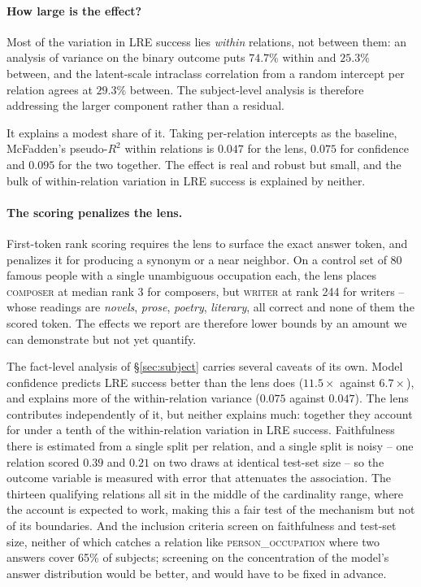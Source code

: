 \paragraph{How large is the effect?} Most of the variation in LRE success
lies \emph{within} relations, not between them: an analysis of variance on
the binary outcome puts $74.7\%$ within and $25.3\%$ between, and the
latent-scale intraclass correlation from a random intercept per relation
agrees at $29.3\%$ between. The subject-level analysis is therefore
addressing the larger component rather than a residual.

It explains a modest share of it. Taking per-relation intercepts as the
baseline, McFadden's pseudo-$R^2$ within relations is $0.047$ for the lens,
$0.075$ for confidence and $0.095$ for the two together. The effect is
real and robust but small, and the bulk of within-relation variation in
LRE success is explained by neither.

\paragraph{The scoring penalizes the lens.} First-token rank scoring
requires the lens to surface the exact answer token, and penalizes it for
producing a synonym or a near neighbor. On a control set of 80 famous
people with a single unambiguous occupation each, the lens places
\textsc{composer} at median rank 3 for composers, but \textsc{writer} at
rank 244 for writers -- whose readings are \emph{novels}, \emph{prose},
\emph{poetry}, \emph{literary}, all correct and none of them the scored
token. The effects we report are therefore lower bounds by an amount we
can demonstrate but not yet quantify.


The fact-level analysis of \S\ref{sec:subject} carries several
caveats of its own. Model confidence predicts LRE success better than
the lens does ($11.5\times$ against $6.7\times$), and explains more of the
within-relation variance ($0.075$ against $0.047$). The lens contributes
independently of it, but neither explains much: together they account for
under a tenth of the within-relation variation in LRE success. Faithfulness there is estimated from a single split per
relation, and a single split is noisy -- one relation scored $0.39$ and
$0.21$ on two draws at identical test-set size -- so the outcome variable
is measured with error that attenuates the association. The thirteen
qualifying relations all sit in the middle of the cardinality range, where
the account is expected to work, making this a fair test of the mechanism
but not of its boundaries. And the inclusion criteria screen on
faithfulness and test-set size, neither of which catches a relation like
\textsc{person\_occupation} where two answers cover 65\% of subjects;
screening on the concentration of the model's answer distribution would
be better, and would have to be fixed in advance.
